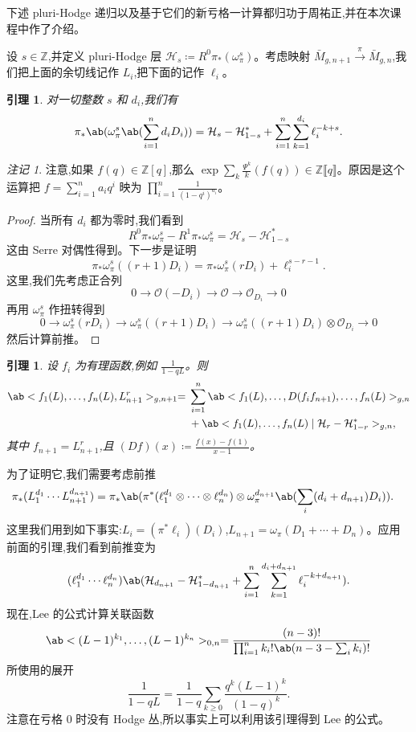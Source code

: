 \documentclass{amsart}
\newtheorem{lem}[thm]{引理}
\theoremstyle{definition}
\theoremstyle{remark}
\newtheorem{rmk}[thm]{注记}
\theoremstyle{plain}
\theoremstyle{definition}
\theoremstyle{remark}
\newcommand{\Z}{\mathbb{Z}}
\newcommand{\mc}[1]{\mathcal{#1}}
\newcommand{\1}{\mathbf{1}}
\newcommand{\2}{\mathbf{2}}
\newcommand{\3}{\mathbf{3}}
\newcommand{\ps}[1]{\llbracket #1 \rrbracket}
\begin{document}
下述 pluri-Hodge 递归以及基于它们的新亏格一计算都归功于周祐正,并在本次课程中作了介绍。

设 \(s \in \Z\),并定义 pluri-Hodge 层 \(\mc{H}_s \coloneqq R^0 \pi_* (\omega_{\pi}^s)\)。考虑映射 \(\bar{M}_{g,n+1} \xrightarrow{\pi} \bar{M}_{g,n}\),我们把上面的余切线记作 \(L_i\),把下面的记作 \(\ell_i\)。

\begin{lem}
    对一切整数 \(s\) 和 \(d_i\),我们有
    \[ \pi_*\ab(\omega_{\pi}^s\ab(\sum_{i=1}^n d_i D_i)) = \mc{H}_s-\mc{H}_{1-s}^* + \sum_{i=1}^n \sum_{k=1}^{d_i} \ell_i^{-k+s}. \]
\end{lem}

\begin{rmk}
    注意,如果 \(f(q) \in \Z[q]\),那么 \(\exp \sum_k \frac{\Psi^k}{k} (f(q)) \in \Z \ps{q}\)。原因是这个运算把 \(f = \sum_{i=1}^{n} a_i q^i\) 映为 \(\prod_{i=1}^n \frac{1}{(1-q^i)^{a_i}}\)。
\end{rmk}

\begin{proof}
    当所有 \(d_i\) 都为零时,我们看到
    \[ R^0 \pi_* \omega_{\pi}^s - R^1 \pi_* \omega_{\pi}^s = \mc{H}_s - \mc{H}_{1-s}^* \]
    这由 Serre 对偶性得到。下一步是证明
    \[ \pi_* \omega_{\pi}^s ((r+1)D_i) = \pi_* \omega_{\pi}^s(r D_i) + \ell_i^{s-r-1}. \]
    这里,我们先考虑正合列
    \[ 0 \to \mc{O} (-D_i) \to \mc{O} \to \mc{O}_{D_i} \to 0 \]
    再用 \(\omega_{\pi}^s\) 作扭转得到
    \[ 0 \to \omega_{\pi}^s(r D_i) \to \omega_{\pi}^s ((r+1)D_i) \to \omega_{\pi}^s ((r+1)D_i) \otimes \mc{O}_{D_i} \to 0 \]
    然后计算前推。
\end{proof}

\begin{lem}
    设 \(f_i\) 为有理函数,例如 \(\frac{1}{1-q L}\)。则
    \begin{align*}
        \ab<f_1(L), \ldots, f_n(L), L_{n+1}^r>_{g, n+1} ={}& \sum_{i=1}^n \ab<f_1(L), \ldots, D(f_i f_{n+1}), \ldots, f_n(L)>_{g, n} \\
        &+ \ab<f_1(L), \ldots, f_n(L) \mid \mc{H}_r - \mc{H}_{1-r}^*>_{g,n},
    \end{align*}
    其中 \(f_{n+1} = L_{n+1}^r\),且 \((Df)(x) \coloneqq \frac{f(x)-f(1)}{x-1}\)。
\end{lem}

为了证明它,我们需要考虑前推
\begin{align*}
    \pi_* (L_1^{d_1} \cdots L_{n+1}^{d_{n+1}}) &= \pi_* \ab(\pi^*(\ell_1^{d_1} \otimes \cdots \otimes \ell_n^{d_n}) \otimes \omega_{\pi}^{d_{n+1}}\ab(\sum_i (d_i+d_{n+1})D_i)).
\end{align*}
这里我们用到如下事实:\(L_i = (\pi^* \ell_i)(D_i)\),\(L_{n+1} = \omega_{\pi}(D_1 + \cdots + D_n)\)。应用前面的引理,我们看到前推变为
\[ (\ell_1^{d_1} \cdots \ell_n^{d_n})\ab(\mc{H}_{d_{n+1}} - \mc{H}_{1-d_{n+1}}^* + \sum_{i=1}^n \sum_{k=1}^{d_i + d_{n+1}} \ell_i^{-k+d_{n+1}}). \]
现在,Lee 的公式计算关联函数
\[ \ab<(L-1)^{k_1}, \ldots, (L-1)^{k_n}>_{0,n} = \frac{(n-3)!}{\prod_{i=1}^n k_i! \ab(n-3-\sum_i k_i)!} \]
所使用的展开
\[ \frac{1}{1-qL} = \frac{1}{1-q} \sum_{k \geq 0} \frac{q^k(L-1)^k}{(1-q)^k}. \]
注意在亏格 \(0\) 时没有 Hodge 丛,所以事实上可以利用该引理得到 Lee 的公式。
\end{document}

